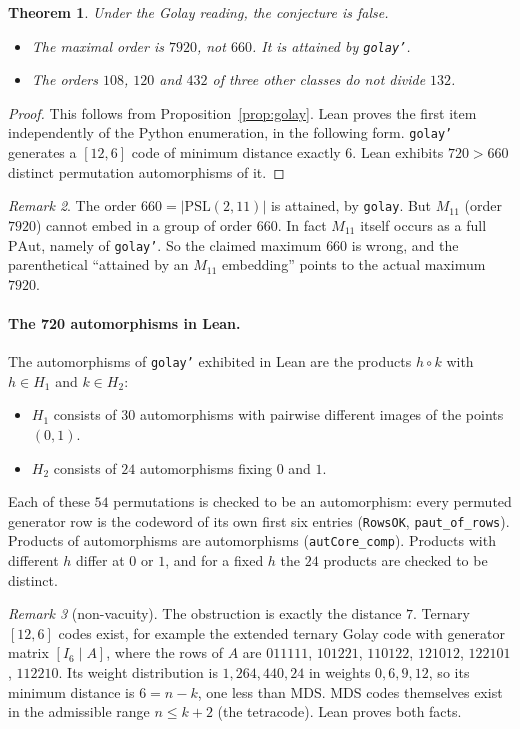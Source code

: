\documentclass[11pt]{article}
\newtheorem{theorem}{Theorem}
\theoremstyle{remark}
\newtheorem{remark}[theorem]{Remark}
\begin{document}
\begin{theorem}\label{thm:golay}
Under the Golay reading, the conjecture is false.
\begin{itemize}
\item The maximal order is $7920$, not $660$. It is attained by \texttt{golay'}.
\item The orders $108$, $120$ and $432$ of three other classes do not divide $132$.
\end{itemize}
\end{theorem}
\begin{proof}
This follows from Proposition~\ref{prop:golay}. Lean proves the first item
independently of the Python enumeration, in the following form. \texttt{golay'}
generates a $[12,6]$ code of minimum distance exactly $6$. Lean exhibits
$720>660$ distinct permutation automorphisms of it.
\end{proof}

\begin{remark}
The order $660=|\mathrm{PSL}(2,11)|$ is attained, by \texttt{golay}. But
$M_{11}$ (order $7920$) cannot embed in a group of order $660$. In fact $M_{11}$
itself occurs as a full $\mathrm{PAut}$, namely of \texttt{golay'}. So the
claimed maximum $660$ is wrong, and the parenthetical ``attained by an $M_{11}$
embedding'' points to the actual maximum $7920$.
\end{remark}

\paragraph{The 720 automorphisms in Lean.} The automorphisms of \texttt{golay'}
exhibited in Lean are the products $h\circ k$ with $h\in H_1$ and $k\in H_2$:
\begin{itemize}
\item $H_1$ consists of $30$ automorphisms with pairwise different images of
the points $(0,1)$.
\item $H_2$ consists of $24$ automorphisms fixing $0$ and $1$.
\end{itemize}
Each of these $54$ permutations is checked to be an automorphism: every permuted
generator row is the codeword of its own first six entries (\texttt{RowsOK},
\texttt{paut\_of\_rows}). Products of automorphisms are automorphisms
(\texttt{autCore\_comp}). Products with different $h$ differ at $0$ or $1$, and
for a fixed $h$ the $24$ products are checked to be distinct.

\begin{remark}[non-vacuity]
The obstruction is exactly the distance $7$. Ternary $[12,6]$ codes exist, for
example the extended ternary Golay code with generator matrix $[I_6\mid A]$, where
the rows of $A$ are $011111$, $101221$, $110122$, $121012$, $122101$, $112210$. Its
weight distribution is $1,264,440,24$ in weights $0,6,9,12$, so its minimum
distance is $6=n-k$, one less than MDS. MDS codes themselves exist in the
admissible range $n\le k+2$ (the tetracode). Lean proves both facts.
\end{remark}
\end{document}
